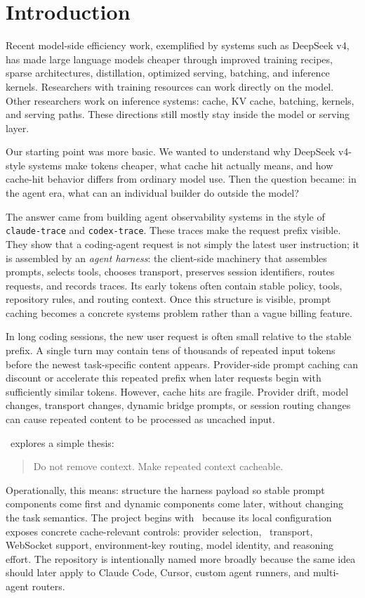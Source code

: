 \section{Introduction}
\label{sec:introduction}

Recent model-side efficiency work, exemplified by systems such as DeepSeek v4, has made large language models cheaper through improved training recipes, sparse architectures, distillation, optimized serving, batching, and inference kernels. Researchers with training resources can work directly on the model. Other researchers work on inference systems: cache, KV cache, batching, kernels, and serving paths. These directions still mostly stay inside the model or serving layer.

Our starting point was more basic. We wanted to understand why DeepSeek v4-style systems make tokens cheaper, what cache hit actually means, and how cache-hit behavior differs from ordinary model use. Then the question became: in the agent era, what can an individual builder do outside the model?

The answer came from building agent observability systems in the style of \texttt{claude-trace} and \texttt{codex-trace}. These traces make the request prefix visible. They show that a coding-agent request is not simply the latest user instruction; it is assembled by an \emph{agent harness}: the client-side machinery that assembles prompts, selects tools, chooses transport, preserves session identifiers, routes requests, and records traces. Its early tokens often contain stable policy, tools, repository rules, and routing context. Once this structure is visible, prompt caching becomes a concrete systems problem rather than a vague billing feature.

In long coding sessions, the new user request is often small relative to the stable prefix. A single turn may contain tens of thousands of repeated input tokens before the newest task-specific content appears. Provider-side prompt caching can discount or accelerate this repeated prefix when later requests begin with sufficiently similar tokens. However, cache hits are fragile. Provider drift, model changes, transport changes, dynamic bridge prompts, or session routing changes can cause repeated content to be processed as uncached input.

\toolname\ explores a simple thesis:
\begin{quote}
Do not remove context. Make repeated context cacheable.
\end{quote}
Operationally, this means: structure the harness payload so stable prompt components come first and dynamic components come later, without changing the task semantics.
The project begins with \codex\ because its local configuration exposes concrete cache-relevant controls: provider selection, \responses\ transport, WebSocket support, environment-key routing, model identity, and reasoning effort. The repository is intentionally named more broadly because the same idea should later apply to Claude Code, Cursor, custom agent runners, and multi-agent routers.

